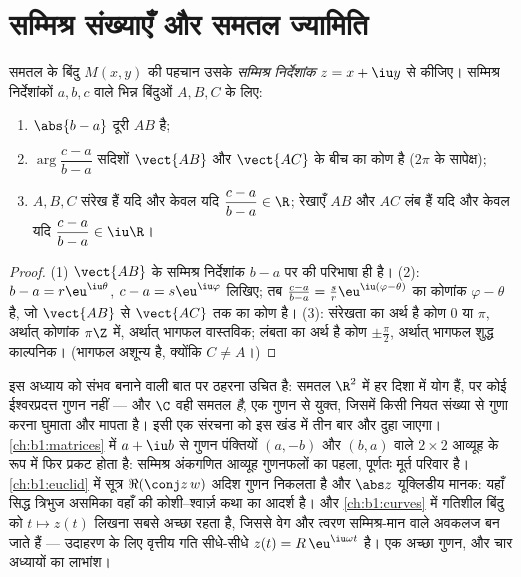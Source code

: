 \section{सम्मिश्र संख्याएँ और समतल ज्यामिति}

\begin{proposition}[ज्यामितीय शब्दकोश]\label{prop:b1:complex:geometry}
समतल के बिंदु $M(x, y)$ की पहचान उसके \emph{सम्मिश्र निर्देशांक} $z = x +
\iu y$ से कीजिए। सम्मिश्र निर्देशांकों $a, b, c$
वाले भिन्न बिंदुओं $A, B, C$ के लिए:
\begin{enumerate}
  \item $\abs{b - a}$ दूरी $AB$ है;
  \item $\arg\dfrac{c - a}{b - a}$ सदिशों $\vect{AB}$ और $\vect{AC}$ के बीच
  का कोण है ($2\pi$ के सापेक्ष);
  \item $A, B, C$ संरेख हैं यदि और केवल यदि $\dfrac{c - a}{b - a} \in \R$;
  रेखाएँ $AB$ और $AC$ लंब हैं यदि और केवल यदि $\dfrac{c - a}{b - a} \in
  \iu\R$।
\end{enumerate}
\end{proposition}

\begin{proof}
(1) $\vect{AB}$ के सम्मिश्र निर्देशांक $b - a$ पर  की परिभाषा ही है।
(2): $b - a = r\eu^{\iu\theta}$, $c - a = s\eu^{\iu\varphi}$ लिखिए; तब
$\frac{c-a}{b-a} = \frac sr \eu^{\iu(\varphi - \theta)}$ का कोणांक $\varphi
- \theta$ है, जो $\vect{AB}$ से $\vect{AC}$ तक का कोण है। (3): संरेखता का
अर्थ है कोण $0$ या $\pi$, अर्थात् कोणांक $\pi\Z$ में, अर्थात् भागफल
वास्तविक; लंबता का अर्थ है कोण $\pm\frac\pi2$, अर्थात् भागफल शुद्ध काल्पनिक।
(भागफल अशून्य है, क्योंकि $C \neq A$।)
\end{proof}

\begin{remark}[मध्यांतर: $\C$ गुणन से युक्त समतल है]\label{rem:b1:complex:interlude}
इस अध्याय को संभव बनाने वाली बात पर ठहरना उचित है: समतल $\R^2$ में हर दिशा
में योग हैं, पर कोई ईश्वरप्रदत्त गुणन नहीं --- और $\C$ वही समतल \emph{है},
एक गुणन से युक्त, जिसमें किसी नियत संख्या से गुणा करना घुमाता और मापता है।
इसी एक संरचना को इस खंड में तीन बार और दुहा जाएगा। \cref{ch:b1:matrices} में
$a + \iu b$ से गुणन पंक्तियों $(a, -b)$ और $(b, a)$ वाले $2 \times 2$ आव्यूह
के रूप में फिर प्रकट होता है: सम्मिश्र अंकगणित आव्यूह गुणनफलों का पहला,
पूर्णतः मूर्त परिवार है। \cref{ch:b1:euclid} में सूत्र $\Re(\conj z\,w)$
अदिश गुणन निकलता है और $\abs z$ यूक्लिडीय मानक: यहाँ सिद्ध त्रिभुज असमिका
वहाँ की कोशी--श्वार्ज़ कथा का आदर्श है। और \cref{ch:b1:curves} में गतिशील
बिंदु को $t \mapsto z(t)$ लिखना सबसे अच्छा रहता है, जिससे वेग और त्वरण
सम्मिश्र-मान वाले अवकलज बन जाते हैं --- उदाहरण के लिए वृत्तीय गति सीधे-सीधे
$z(t) = R\,\eu^{\iu\omega t}$ है। एक अच्छा गुणन, और चार अध्यायों का लाभांश।
\end{remark}

